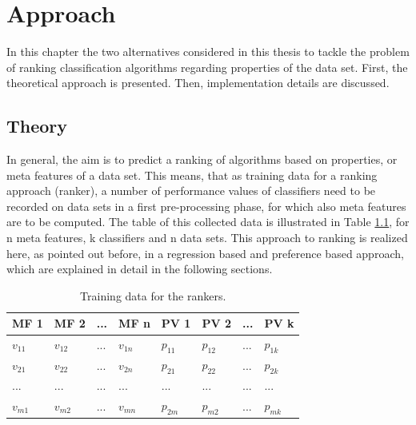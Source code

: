 %
\chapter{Approach}
\label{sec:approach}

In this chapter the two alternatives considered in this thesis to tackle the problem of ranking classification algorithms regarding properties of the data set. First, the theoretical approach is presented. Then, implementation details are discussed.

\section{Theory}

In general, the aim is to predict a ranking of algorithms based on properties, or meta features of a data set. This means, that as training data for a ranking approach (ranker), a number of performance values of classifiers need to be recorded on data sets in a first pre-processing phase, for which also meta features are to be computed. The table of this collected data is illustrated in Table \ref{tab:performanceValues}, for n meta features, k classifiers and n data sets. This approach to ranking is realized here, as pointed out before, in a regression based and preference based approach, which are explained in detail in the following sections.

\begin{table}[h]
\centering
	\begin{tabularx}{\textwidth}{X | X | X | X | X | X | X | X}
		MF 1			& MF 2		& ... 	& MF n		& PV 1 		& PV 2 		&	...	&	PV k 		\\ \hline
		$v_{11}$		& $v_{12}$	& ...	& $v_{1n}$	& $p_{11}$	& $p_{12}$	& 	...	&	$p_{1k}$		\\ 
		$v_{21}$		& $v_{22}$	& ...	& $v_{2n}$	& $p_{21}$	& $p_{22}$	& 	...	&	$p_{2k}$		\\ 
		...			& ...		& ...	& ...		& ...		& ...		&	...	&	...			\\ 
		$v_{m1}$		& $v_{m2}$	& ... 	& $v_{mn}$	& $p_{2m}$	& $p_{m2}$	& 	...	&	$p_{mk}$			 
	\end{tabularx}
	\label{tab:performanceValues}
	\caption{Training data for the rankers.}
\end{table}

